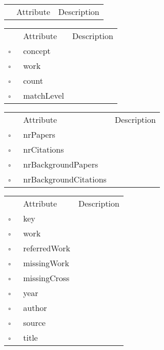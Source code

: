 \begin{table}
\caption{ConceptType  }

\begin{longtable}{llp{8cm}}
& Attribute & Description \\
\end{longtable}
\label{attr:ConceptType}
\end{table}

\begin{table}
\caption{ConceptWork  }

\begin{longtable}{llp{8cm}}
& Attribute & Description \\
$\square$\ & concept &  \\
$\square$\ & work &  \\
$\square$\ & count &  \\
$\square$\ & matchLevel &  \\
\end{longtable}
\label{attr:ConceptWork}
\end{table}

\begin{table}
\caption{ConferenceSeries  }

\begin{longtable}{llp{8cm}}
& Attribute & Description \\
$\square$\ & nrPapers &  \\
$\square$\ & nrCitations &  \\
$\square$\ & nrBackgroundPapers &  \\
$\square$\ & nrBackgroundCitations &  \\
\end{longtable}
\label{attr:ConferenceSeries}
\end{table}

\begin{table}
\caption{CrossReference  }

\begin{longtable}{llp{8cm}}
& Attribute & Description \\
$\square$\ & key &  \\
$\square$\ & work &  \\
$\square$\ & referredWork &  \\
$\square$\ & missingWork &  \\
$\square$\ & missingCross &  \\
$\square$\ & year &  \\
$\square$\ & author &  \\
$\square$\ & source &  \\
$\square$\ & title &  \\
\end{longtable}
\label{attr:CrossReference}
\end{table}


